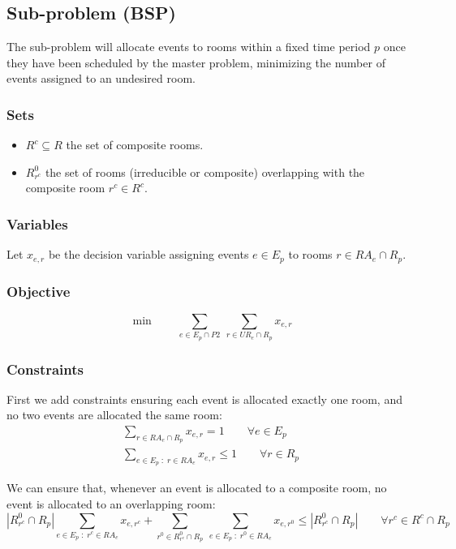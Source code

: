 \documentclass{article}
\theoremstyle{plain}
\numberwithin{theorem}{section}
\numberwithin{example}{section}
\theoremstyle{definition}
\begin{document}
\subsection{Sub-problem (BSP)} \label{BSP}
The sub-problem will allocate events to rooms within a fixed time period $p$
once they have been scheduled by the master problem, minimizing the number of
events assigned to an undesired room.

\subsubsection*{Sets}
\begin{itemize}
    \item $R^c \subseteq R$ the set of composite rooms.
    \item $R^0_{r^c}$ the set of rooms (irreducible or composite) overlapping
        with the composite room $r^c \in R^c$.
\end{itemize}

\subsubsection*{Variables}
Let $x_{e,r}$ be the decision variable assigning events $e \in E_p$ to rooms $r
\in RA_e \cap R_p$.

\subsubsection*{Objective}
\begin{equation}
    \min \qquad \sum_{e \in E_p \cap P2} \
        \sum_{r \in UR_e \cap R_p} x_{e,r}
\end{equation}

\subsubsection*{Constraints}
First we add constraints ensuring each event is allocated exactly one room, and
no two events are allocated the same room:
\begin{gather}
    \sum_{r \in RA_e \cap R_p} x_{e,r} = 1 \qquad \forall e \in E_p \\
    \sum_{e \in E_p \; : \; r \in RA_e} x_{e, r} \leq 1 \qquad \forall r \in R_p
\end{gather}

We can ensure that, whenever an event is allocated to a composite room, no event
is allocated to an overlapping room:
\begin{equation}
    |R^0_{r^c} \cap R_p| \sum_{e \in E_p \; : \; r^c \in RA_e} x_{e, r^c}
        + \sum_{r^0 \in R^0_{r^c} \cap R_p} \ \sum_{e \in E_p \; : \; r^0 \in RA_e}
        x_{e, r^0} \leq |R^0_{r^c} \cap R_p| \qquad \forall r^c \in R^c \cap R_p
\end{equation}
\end{document}

